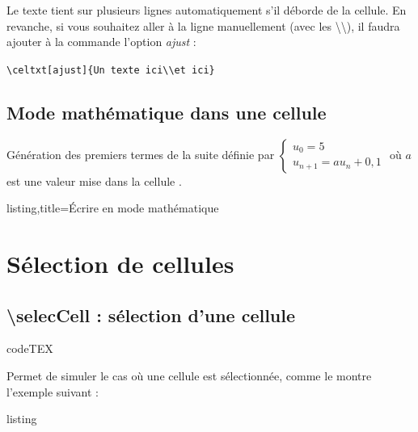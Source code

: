 \documentclass[a4paper,french]{article}
\begin{document}
Le texte tient sur plusieurs lignes automatiquement s'il d\'eborde de la cellule. En revanche, si vous souhaitez aller \`a la ligne manuellement (avec les \textbackslash\textbackslash), il faudra ajouter \`a la commande l'option \emph{ajust} :
\begin{center}
\texttt{\textbackslash celtxt[ajust]\{Un texte ici\textbackslash\textbackslash et ici\}}
\end{center}

\subsection{Mode math\'ematique dans une cellule}

G\'en\'eration des premiers termes de la suite d\'efinie par $\left\{\begin{array}{l}
u_0=5\\
u_{n+1}=au_n+0,1
\end{array}
\right.$ o\`u $a$ est une valeur mise dans la cellule {}.

\begin{tcblisting}{listing,title=\'Ecrire en mode math\'ematique}
\end{tcblisting}

\section{S\'election de cellules}

\subsection{\textbackslash selecCell : s\'election d'une cellule}

\begin{tcblisting}{codeTEX}
\end{tcblisting}

\medskip

Permet de simuler le cas o\`u une cellule est s\'electionn\'ee, comme le montre l'exemple suivant :

\medskip

\begin{tcblisting}{listing}
\end{tcblisting}
\end{document}
